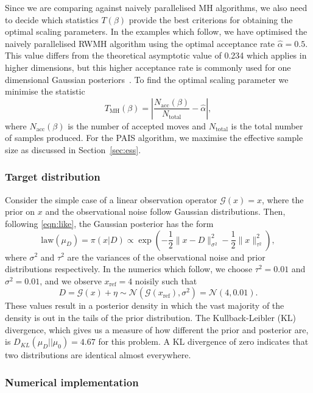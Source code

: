 \documentclass[final]{siamltex}
\newcommand{\G}{\mathcal{G}}
\begin{document}
Since we are comparing against naively parallelised MH algorithms,
we also need to decide which statistics $T(\beta)$ provide the best criterions
for obtaining the optimal scaling parameters. In the examples which follow, we have
optimised the naively parallelised RWMH algorithm using the optimal
acceptance rate $\hat{\alpha} = 0.5$. This value differs from the theoretical
asymptotic value of 0.234 which applies in higher dimensions, but this higher acceptance rate is commonly used for one dimensional Gaussian posteriors~\cite{rosenthal2011optimal}. To find the optimal
scaling parameter we minimise the statistic
\[
	T_{\text{MH}}(\beta) = \left| \frac{N_{\text{acc}}(\beta)}{N_{\text{total}}} - \hat{\alpha} \right|,
\]
where $N_{\text{acc}}(\beta)$ is the number of accepted moves and
$N_{\text{total}}$ is the total number of samples produced. For the
PAIS algorithm, we maximise the effective sample size as
discussed in Section~\ref{sec:ess}.

\subsubsection{Target distribution}

Consider the simple case of a linear observation operator $\G(x) = x$, where the prior on $x$ and the observational noise follow Gaussian distributions. Then, following \eqref{eqn:like}, the Gaussian posterior has the form
\begin{equation}\label{eqn:Gaussian posterior}
	\text{law}(\mu_D) = \pi(x|D) \propto \exp\left(-\frac{1}{2}\big\|x - D\big\|^2_{\sigma^2} - \frac{1}{2}\big\|x\big\|^2_{\tau^2}\right),
\end{equation}
where $\sigma^2$ and $\tau^2$ are the variances of the
observational noise and prior distributions respectively. In the
numerics which follow, we choose $\tau^2 =0.01$ and $\sigma^2 = 0.01$, and
we observe $x_\text{ref}=4$ noisily such that
\[
D = \mathcal{G}(x) + \eta \sim \mathcal{N}(\mathcal{G}(x_\text{ref}),\sigma^2) = \mathcal{N}(4,0.01).
\]
These values result in a posterior density in which the vast majority
of the density is out in the tails of the
prior distribution. The Kullback-Leibler (KL)
divergence, which gives us a measure of how different the prior and
posterior are, is $D_{KL}(\mu_D || \mu_0) = 4.67$ for this
problem. A KL divergence of zero indicates that two distributions are
identical almost everywhere.

\subsubsection{Numerical implementation}\label{sec:Implementation P1}
\end{document}

